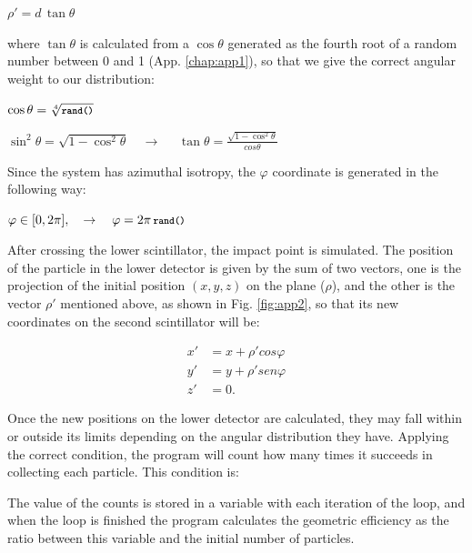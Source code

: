 	\bc$\rho' = d\,\tan\theta$\ec

where $\tan\theta$ is calculated from a $\cos\theta$ generated as the fourth root of a random number between 0 and 1 (App. \ref{chap:app1}), so that we give the correct angular weight to our distribution:

	\bc
		$\cos\theta = \sqrt[4]{\textbf{\texttt{\footnotesize rand()}}}$

		$\sin^2\theta = \sqrt{1 - \cos^2\theta} \quad \rightarrow \quad$
		$\tan\theta = \frac{\sqrt{1 - \cos^2\theta}}{cos\theta}$
	\ec

Since the system has azimuthal isotropy, the $\varphi$ coordinate is generated in the following way:

	\bc $\varphi \in [0, 2\pi], \quad \rightarrow \quad \varphi = 2\pi\,\textbf{\texttt{\footnotesize rand()}}$ \ec

	\item After crossing the lower scintillator, the impact point is simulated. The position of the particle in the lower detector is given by the sum of two vectors, one is the projection of the initial position $(x, y, z)$ on the plane ($\rho$), and the other is the vector $\rho'$ mentioned above, as shown in Fig. \ref{fig:app2}, so that its new coordinates on the second scintillator will be:

	\begin{equation*}
		\begin{split}
			x' &= x + \rho'cos\varphi\\
			y' &= y + \rho'sen\varphi\\
			z' &= 0.
		\end{split}
	\end{equation*}

	\item Once the new positions on the lower detector are calculated, they may fall within or outside its limits depending on the angular distribution they have. Applying the correct condition, the program will count how many times it succeeds in collecting each particle. This condition is:


The value of the counts is stored in a variable with each iteration of the  loop, and when the loop is finished the program calculates the geometric efficiency as the ratio between this variable and the initial number of particles.
\een

